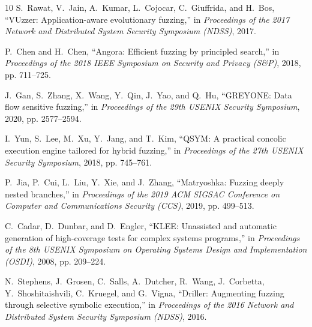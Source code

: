 \documentclass[review]{elsarticle}
\begin{document}
\begin{thebibliography}{10}
S.~Rawat, V.~Jain, A.~Kumar, L.~Cojocar, C.~Giuffrida, and H.~Bos, ``VUzzer: Application-aware evolutionary fuzzing,'' in \emph{Proceedings of the 2017 Network and Distributed System Security Symposium (NDSS)}, 2017.

P.~Chen and H.~Chen, ``Angora: Efficient fuzzing by principled search,'' in \emph{Proceedings of the 2018 IEEE Symposium on Security and Privacy (S\&P)}, 2018, pp. 711--725.

J.~Gan, S.~Zhang, X.~Wang, Y.~Qin, J.~Yao, and Q.~Hu, ``GREYONE: Data flow sensitive fuzzing,'' in \emph{Proceedings of the 29th USENIX Security Symposium}, 2020, pp. 2577--2594.

I.~Yun, S.~Lee, M.~Xu, Y.~Jang, and T.~Kim, ``QSYM: A practical concolic execution engine tailored for hybrid fuzzing,'' in \emph{Proceedings of the 27th USENIX Security Symposium}, 2018, pp. 745--761.

P.~Jia, P.~Cui, L.~Liu, Y.~Xie, and J.~Zhang, ``Matryoshka: Fuzzing deeply nested branches,'' in \emph{Proceedings of the 2019 ACM SIGSAC Conference on Computer and Communications Security (CCS)}, 2019, pp. 499--513.

C.~Cadar, D.~Dunbar, and D.~Engler, ``KLEE: Unassisted and automatic generation of high-coverage tests for complex systems programs,'' in \emph{Proceedings of the 8th USENIX Symposium on Operating Systems Design and Implementation (OSDI)}, 2008, pp. 209--224.

N.~Stephens, J.~Grosen, C.~Salls, A.~Dutcher, R.~Wang, J.~Corbetta, Y.~Shoshitaishvili, C.~Kruegel, and G.~Vigna, ``Driller: Augmenting fuzzing through selective symbolic execution,'' in \emph{Proceedings of the 2016 Network and Distributed System Security Symposium (NDSS)}, 2016.

\end{thebibliography}
\end{document}
